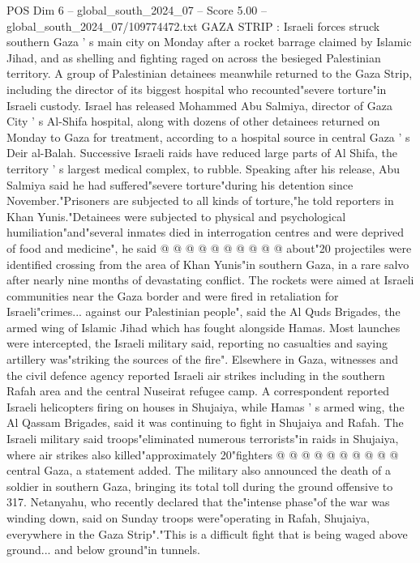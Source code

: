 \begin{textsample}{POS Dim 6 – global\_south\_2024\_07 – Score 5.00 – global\_south\_2024\_07/109774472.txt}  \label{ex:f6_pos_315}
GAZA STRIP : Israeli forces struck southern Gaza ' s main city on Monday after a rocket barrage claimed by Islamic Jihad, and as shelling and fighting raged on across the besieged Palestinian territory.
A group of Palestinian detainees meanwhile returned to the Gaza Strip, including the director of its biggest hospital who recounted"severe torture"in Israeli custody.
Israel has released Mohammed Abu Salmiya, director of Gaza City ' s Al-Shifa hospital, along with dozens of other detainees returned on Monday to Gaza for treatment, according to a hospital source in central Gaza ' s Deir al-Balah.
Successive Israeli raids have reduced large parts of Al Shifa, the territory ' s largest medical complex, to rubble.
Speaking after his release, Abu Salmiya said he had suffered"severe torture"during his detention since November."Prisoners are subjected to all kinds of torture,"he told reporters in Khan Yunis."Detainees were subjected to physical and psychological humiliation"and"several inmates died in interrogation centres and were deprived of food and medicine", he said @ @ @ @ @ @ @ @ @ @ about"20 projectiles were identified crossing from the area of Khan Yunis"in southern Gaza, in a rare salvo after nearly nine months of devastating conflict.
The rockets were aimed at Israeli communities near the Gaza border and were fired in retaliation for Israeli"crimes... against our Palestinian people", said the Al Quds Brigades, the armed wing of Islamic Jihad which has fought alongside Hamas.
Most launches were intercepted, the Israeli military said, reporting no casualties and saying artillery was"striking the sources of the fire".
Elsewhere in Gaza, witnesses and the civil defence agency reported Israeli air strikes including in the southern Rafah area and the central Nuseirat refugee camp.
A correspondent reported Israeli helicopters firing on houses in Shujaiya, while Hamas ' s armed wing, the Al Qassam Brigades, said it was continuing to fight in Shujaiya and Rafah.
The Israeli military said troops"eliminated numerous terrorists"in raids in Shujaiya, where air strikes also killed"approximately 20"fighters @ @ @ @ @ @ @ @ @ @ central Gaza, a statement added.
The military also announced the death of a soldier in southern Gaza, bringing its total toll during the ground offensive to 317.
Netanyahu, who recently declared that the"intense phase"of the war was winding down, said on Sunday troops were"operating in Rafah, Shujaiya, everywhere in the Gaza Strip"."This is a difficult fight that is being waged above ground... and below ground"in tunnels.

\end{textsample}

